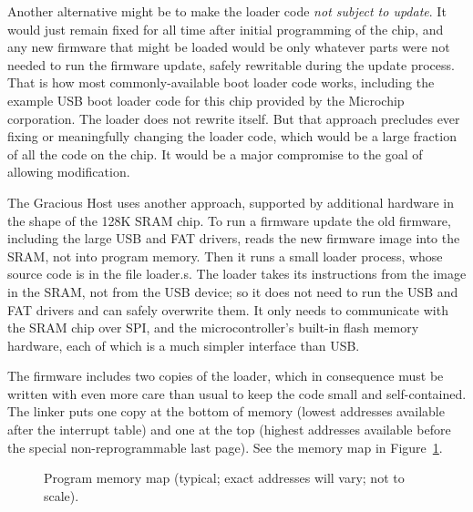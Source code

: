Another alternative might be to make the loader code \emph{not subject to
update}.  It would just remain fixed for all time after initial programming
of the chip, and any new firmware that might be loaded would be only
whatever parts were not needed to run the firmware update, safely rewritable
during the update process.  That is how most commonly-available boot loader
code works, including the example USB boot loader code for this chip
provided by the Microchip corporation.  The loader does not rewrite itself. 
But that approach precludes ever fixing or meaningfully changing the loader
code, which would be a large fraction of all the code on the chip.  It would
be a major compromise to the goal of allowing modification.

The Gracious Host uses another approach, supported by additional hardware in
the shape of the 128K SRAM chip.  To run a firmware update the old firmware,
including the large USB and FAT drivers, reads the new firmware image into
the SRAM, not into program memory.  Then it runs a small loader
process, whose source code is in the file loader.s.  The loader takes its
instructions from the image in the SRAM, not from the USB device; so it does
not need to run the USB and FAT drivers and can safely overwrite them.  It
only needs to communicate with the SRAM chip over SPI, and the
microcontroller's built-in flash memory hardware, each of which is a much
simpler interface than USB.

The firmware includes two copies of the loader, which in consequence must be
written with even more care than usual to keep the code small and
self-contained.  The linker puts one copy at the bottom of memory (lowest
addresses available after the interrupt table) and one at the top (highest
addresses available before the special non-reprogrammable last page).  See
the memory map in Figure~\ref{fig:memory-map}.

\begin{figure}
  {\centering
  \par}
  \caption{Program memory map (typical; exact addresses will vary; not to
    scale).}\label{fig:memory-map}
\end{figure}

